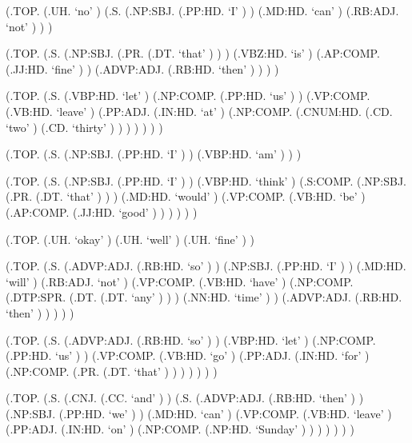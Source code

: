 \documentclass[10pt]{article}
\begin{document}
\begin{parsetree}  (.TOP. (.UH. `no' ) (.S. (.NP:SBJ. (.PP:HD. `I' ) ) (.MD:HD. `can' ) (.RB:ADJ. `not' ) ) ) \end{parsetree}

\begin{parsetree}  (.TOP. (.S. (.NP:SBJ. (.PR. (.DT. `that' ) ) ) (.VBZ:HD. `is' ) (.AP:COMP. (.JJ:HD. `fine' ) ) (.ADVP:ADJ. (.RB:HD. `then' ) ) ) ) \end{parsetree}

\begin{parsetree}  (.TOP. (.S. (.VBP:HD. `let' ) (.NP:COMP. (.PP:HD. `us' ) ) (.VP:COMP. (.VB:HD. `leave' ) (.PP:ADJ. (.IN:HD. `at' ) (.NP:COMP. (.CNUM:HD. (.CD. `two' ) (.CD. `thirty' ) ) ) ) ) ) ) \end{parsetree}

\begin{parsetree}  (.TOP. (.S. (.NP:SBJ. (.PP:HD. `I' ) ) (.VBP:HD. `am' ) ) ) \end{parsetree}

\begin{parsetree}  (.TOP. (.S. (.NP:SBJ. (.PP:HD. `I' ) ) (.VBP:HD. `think' ) (.S:COMP. (.NP:SBJ. (.PR. (.DT. `that' ) ) ) (.MD:HD. `would' ) (.VP:COMP. (.VB:HD. `be' ) (.AP:COMP. (.JJ:HD. `good' ) ) ) ) ) ) \end{parsetree}

\begin{parsetree}  (.TOP. (.UH. `okay' ) (.UH. `well' ) (.UH. `fine' ) ) \end{parsetree}

\begin{parsetree}  (.TOP. (.S. (.ADVP:ADJ. (.RB:HD. `so' ) ) (.NP:SBJ. (.PP:HD. `I' ) ) (.MD:HD. `will' ) (.RB:ADJ. `not' ) (.VP:COMP. (.VB:HD. `have' ) (.NP:COMP. (.DTP:SPR. (.DT. (.DT. `any' ) ) ) (.NN:HD. `time' ) ) (.ADVP:ADJ. (.RB:HD. `then' ) ) ) ) ) \end{parsetree}

\begin{parsetree}  (.TOP. (.S. (.ADVP:ADJ. (.RB:HD. `so' ) ) (.VBP:HD. `let' ) (.NP:COMP. (.PP:HD. `us' ) ) (.VP:COMP. (.VB:HD. `go' ) (.PP:ADJ. (.IN:HD. `for' ) (.NP:COMP. (.PR. (.DT. `that' ) ) ) ) ) ) ) \end{parsetree}

\begin{parsetree}  (.TOP. (.S. (.CNJ. (.CC. `and' ) ) (.S. (.ADVP:ADJ. (.RB:HD. `then' ) ) (.NP:SBJ. (.PP:HD. `we' ) ) (.MD:HD. `can' ) (.VP:COMP. (.VB:HD. `leave' ) (.PP:ADJ. (.IN:HD. `on' ) (.NP:COMP. (.NP:HD. `Sunday' ) ) ) ) ) ) ) \end{parsetree}
\end{document}
